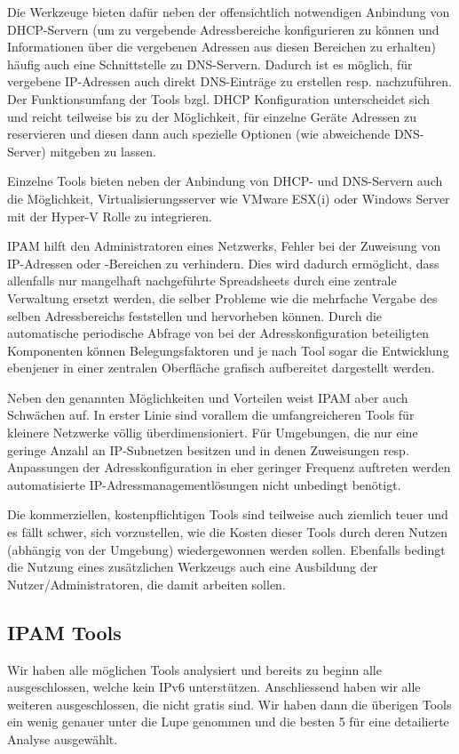\documentclass[11pt,a4paper,parskip=half]{scrartcl}
\begin{document}
Die Werkzeuge bieten dafür neben der offensichtlich notwendigen Anbindung von DHCP-Servern (um zu vergebende Adressbereiche konfigurieren zu können und Informationen über die vergebenen Adressen aus diesen Bereichen zu erhalten) häufig auch eine Schnittstelle zu DNS-Servern. Dadurch ist es möglich, für vergebene IP-Adressen auch direkt DNS-Einträge zu erstellen resp. nachzuführen. Der Funktionsumfang der Tools bzgl. DHCP Konfiguration unterscheidet sich und reicht teilweise bis zu der Möglichkeit, für einzelne Geräte Adressen zu reservieren und diesen dann auch spezielle Optionen (wie abweichende DNS-Server) mitgeben zu lassen.

Einzelne Tools bieten neben der Anbindung von DHCP- und DNS-Servern auch die Möglichkeit, Virtualisierungsserver wie VMware ESX(i) oder Windows Server mit der Hyper-V Rolle zu integrieren.

IPAM hilft den Administratoren eines Netzwerks, Fehler bei der Zuweisung von IP-Adressen oder -Bereichen zu verhindern. Dies wird dadurch ermöglicht, dass allenfalls nur mangelhaft nachgeführte Spreadsheets durch eine zentrale Verwaltung ersetzt werden, die selber Probleme wie die mehrfache Vergabe des selben Adressbereichs feststellen und hervorheben können. Durch die automatische periodische Abfrage von bei der Adresskonfiguration beteiligten Komponenten können Belegungsfaktoren und je nach Tool sogar die Entwicklung ebenjener in einer zentralen Oberfläche grafisch aufbereitet dargestellt werden.

Neben den genannten Möglichkeiten und Vorteilen weist IPAM aber auch Schwächen auf. In erster Linie sind vorallem die umfangreicheren Tools für kleinere Netzwerke völlig überdimensioniert. Für Umgebungen, die nur eine geringe Anzahl an IP-Subnetzen besitzen und in denen Zuweisungen resp. Anpassungen der Adresskonfiguration in eher geringer Frequenz auftreten werden automatisierte IP-Adressmanagementlösungen nicht unbedingt benötigt.

Die kommerziellen, kostenpflichtigen Tools sind teilweise auch ziemlich teuer und es fällt schwer, sich vorzustellen, wie die Kosten dieser Tools durch deren Nutzen (abhängig von der Umgebung) wiedergewonnen werden sollen. Ebenfalls bedingt die Nutzung eines zusätzlichen Werkzeugs auch eine Ausbildung der Nutzer/Administratoren, die damit arbeiten sollen.

\subsection{IPAM Tools}
Wir haben alle möglichen Tools analysiert und bereits zu beginn alle ausgeschlossen, welche kein IPv6 unterstützen. Anschliessend haben wir alle weiteren ausgeschlossen, die nicht gratis sind. Wir haben dann die überigen Tools ein wenig genauer unter die Lupe genommen und die besten 5 für eine detailierte Analyse ausgewählt.
\end{document}

